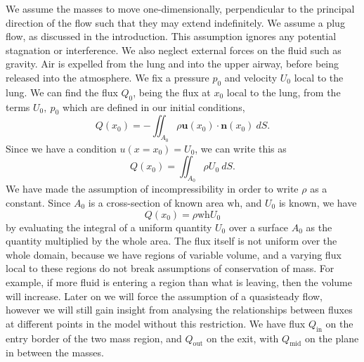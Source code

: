 We assume the masses to move one-dimensionally, perpendicular to the principal direction of the flow such that they may extend indefinitely.
We assume a plug flow, as discussed in the introduction. %
This assumption ignores any potential stagnation or interference.
We also neglect external forces on the fluid such as gravity.
Air is expelled from the lung and into the upper airway, before being released into the atmosphere.
We fix a pressure $p_0$ and velocity $U_0$ local to the lung.
We can find the flux $Q_0$, being the flux at $x_0$ local to the lung, from the terms $U_0,~p_0$ which are defined in our initial conditions,
\begin{equation}
    Q(x_0) = -\iint_{A_0} \rho \mathbf{u}(x_0)\cdot \mathbf{n}(x_0)~dS.
\end{equation}
Since we have a condition $u(x=x_0) = U_0$, we can write this as
\begin{equation}
    Q(x_0) = \iint_{A_0} \rho U_0~dS.
\end{equation}
We have made the assumption of incompressibility in order to write $\rho$ as a constant.
Since $A_0$ is a cross-section of known area $\mathrm{\mathrm{wh}}$, and $U_0$ is known, we have
\begin{equation}
    Q(x_0) = \rho \mathrm{wh} U_0
    \label{eqn:twomass_lung_flux}
\end{equation}
by evaluating the integral of a uniform quantity $U_0$ over a surface $A_0$ as the quantity multiplied by the whole area.
The flux itself is not uniform over the whole domain, because we have regions of variable volume, and a varying flux local to these regions do not break assumptions of conservation of mass.
For example, if more fluid is entering a region than what is leaving, then the volume will increase.
Later on we will force the assumption of a quasisteady flow,
however we will still gain insight from analysing the relationships between fluxes at different points in the model without this restriction.
We have flux $Q_\mathrm{in}$ on the entry border of the two mass region, and $Q_\mathrm{out}$ on the exit,
with $Q_\mathrm{mid}$ on the plane in between the masses.

